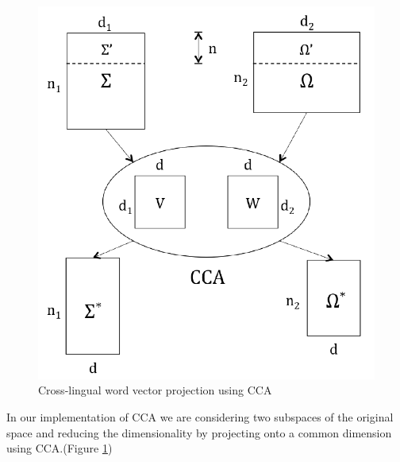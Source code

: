 \documentclass{article} %
\begin{document}
\begin{figure}[H]
	\begin{center}
		\includegraphics[scale = 0.6]{Figures/cca.png}
		\caption{Cross-lingual word vector projection using CCA	}
		\label{fig:CCA_implementation}
	\end{center}
\end{figure}

In our implementation of CCA we are considering two subspaces of the original space and reducing the dimensionality by projecting onto a common dimension using CCA.(Figure \ref{fig:CCA_implementation})
\end{document}
